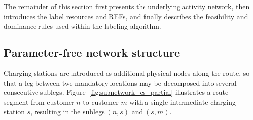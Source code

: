 \documentclass[3p,11pt,authoryear]{elsarticle}  %
\begin{document}
The remainder of this section first presents the underlying activity network, then introduces the label resources and REFs, and finally describes the feasibility and dominance rules used within the labeling algorithm.




\subsection{Parameter-free network structure}
Charging stations are introduced as additional physical nodes along the route, so that a leg between two mandatory locations may be decomposed into several consecutive sublegs. Figure~\ref{fig:subnetwork_cs_partial} illustrates a route segment from customer $n$ to customer $m$ with a single intermediate charging station $s$, resulting in the sublegs $(n,s)$ and $(s,m)$.
\end{document}
